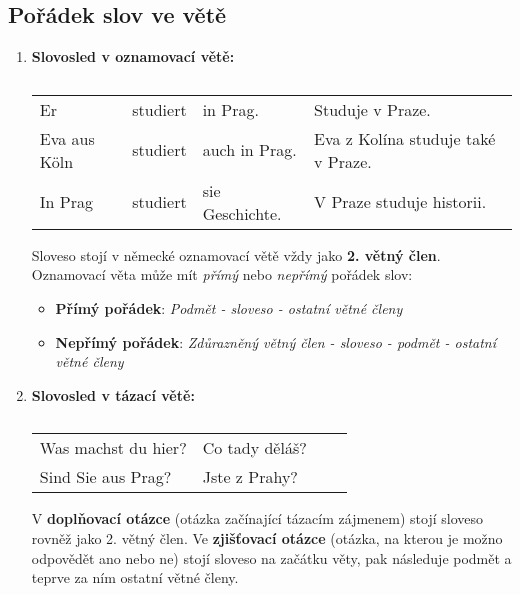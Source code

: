   \subsection*{Pořádek slov ve větě}  %
    \begin{enumerate}[noitemsep]
       \item \textbf{Slovosled v oznamovací větě:}
             \begin{table}[ht!]   
               \hspace*{2em}
               \begin{tabular}{llll}
                 Er           & studiert & in Prag.        & Studuje v Praze.                  \\
                 Eva aus Köln & studiert & auch in Prag.   & Eva z Kolína studuje také v Praze.\\
                 In Prag      & studiert & sie Geschichte. & V Praze studuje historii.         \\
               \end{tabular}
               \caption*{ }
             \end{table}
             
            Sloveso stojí v německé oznamovací větě vždy jako \textbf{2. větný člen}. Oznamovací 
            věta může mít \emph{přímý} nebo \emph{nepřímý} pořádek slov:
            \begin{itemize}
             \item \textbf{Přímý pořádek}:\newline
                   \emph{Podmět - sloveso - ostatní větné členy}
             \item \textbf{Nepřímý pořádek}:\newline
                   \emph{Zdůrazněný větný člen - sloveso - podmět - ostatní větné členy} 
          \end{itemize}
      \item \textbf{Slovosled v tázací větě:}
        \begin{table}[ht!] 
          \hspace*{2em} 
          \begin{tabular}{llll}
            Was machst du hier?  & Co tady děláš? \\
            Sind Sie aus Prag?   & Jste z Prahy?  \\
          \end{tabular}
          \caption*{ }
        \end{table}
         
         V \textbf{doplňovací otázce} (otázka začínající tázacím zájmenem) stojí sloveso 
         rovněž jako 2. větný člen. Ve \textbf{zjišťovací otázce} (otázka, na kterou je možno 
         odpovědět ano nebo ne) stojí sloveso na začátku věty, pak následuje podmět a teprve za ním 
         ostatní větné členy.
    \end{enumerate}
  
